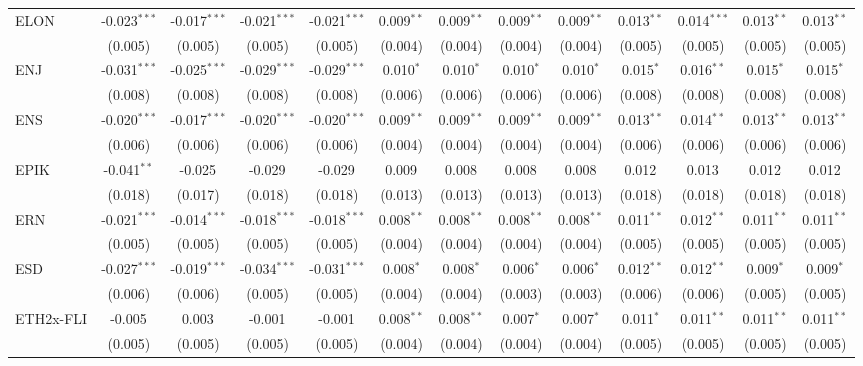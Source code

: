 \begin{table}[!htbp]
\begin{tabular}{@{\extracolsep{5pt}}lcccccccccccc}
 ELON & -0.023$^{***}$ & -0.017$^{***}$ & -0.021$^{***}$ & -0.021$^{***}$ & 0.009$^{**}$ & 0.009$^{**}$ & 0.009$^{**}$ & 0.009$^{**}$ & 0.013$^{**}$ & 0.014$^{***}$ & 0.013$^{**}$ & 0.013$^{**}$ \\
  & (0.005) & (0.005) & (0.005) & (0.005) & (0.004) & (0.004) & (0.004) & (0.004) & (0.005) & (0.005) & (0.005) & (0.005) \\
 ENJ & -0.031$^{***}$ & -0.025$^{***}$ & -0.029$^{***}$ & -0.029$^{***}$ & 0.010$^{*}$ & 0.010$^{*}$ & 0.010$^{*}$ & 0.010$^{*}$ & 0.015$^{*}$ & 0.016$^{**}$ & 0.015$^{*}$ & 0.015$^{*}$ \\
  & (0.008) & (0.008) & (0.008) & (0.008) & (0.006) & (0.006) & (0.006) & (0.006) & (0.008) & (0.008) & (0.008) & (0.008) \\
 ENS & -0.020$^{***}$ & -0.017$^{***}$ & -0.020$^{***}$ & -0.020$^{***}$ & 0.009$^{**}$ & 0.009$^{**}$ & 0.009$^{**}$ & 0.009$^{**}$ & 0.013$^{**}$ & 0.014$^{**}$ & 0.013$^{**}$ & 0.013$^{**}$ \\
  & (0.006) & (0.006) & (0.006) & (0.006) & (0.004) & (0.004) & (0.004) & (0.004) & (0.006) & (0.006) & (0.006) & (0.006) \\
 EPIK & -0.041$^{**}$ & -0.025$^{}$ & -0.029$^{}$ & -0.029$^{}$ & 0.009$^{}$ & 0.008$^{}$ & 0.008$^{}$ & 0.008$^{}$ & 0.012$^{}$ & 0.013$^{}$ & 0.012$^{}$ & 0.012$^{}$ \\
  & (0.018) & (0.017) & (0.018) & (0.018) & (0.013) & (0.013) & (0.013) & (0.013) & (0.018) & (0.018) & (0.018) & (0.018) \\
 ERN & -0.021$^{***}$ & -0.014$^{***}$ & -0.018$^{***}$ & -0.018$^{***}$ & 0.008$^{**}$ & 0.008$^{**}$ & 0.008$^{**}$ & 0.008$^{**}$ & 0.011$^{**}$ & 0.012$^{**}$ & 0.011$^{**}$ & 0.011$^{**}$ \\
  & (0.005) & (0.005) & (0.005) & (0.005) & (0.004) & (0.004) & (0.004) & (0.004) & (0.005) & (0.005) & (0.005) & (0.005) \\
 ESD & -0.027$^{***}$ & -0.019$^{***}$ & -0.034$^{***}$ & -0.031$^{***}$ & 0.008$^{*}$ & 0.008$^{*}$ & 0.006$^{*}$ & 0.006$^{*}$ & 0.012$^{**}$ & 0.012$^{**}$ & 0.009$^{*}$ & 0.009$^{*}$ \\
  & (0.006) & (0.006) & (0.005) & (0.005) & (0.004) & (0.004) & (0.003) & (0.003) & (0.006) & (0.006) & (0.005) & (0.005) \\
 ETH2x-FLI & -0.005$^{}$ & 0.003$^{}$ & -0.001$^{}$ & -0.001$^{}$ & 0.008$^{**}$ & 0.008$^{**}$ & 0.007$^{*}$ & 0.007$^{*}$ & 0.011$^{*}$ & 0.011$^{**}$ & 0.011$^{**}$ & 0.011$^{**}$ \\
  & (0.005) & (0.005) & (0.005) & (0.005) & (0.004) & (0.004) & (0.004) & (0.004) & (0.005) & (0.005) & (0.005) & (0.005) \\

\end{tabular}
\end{table}

